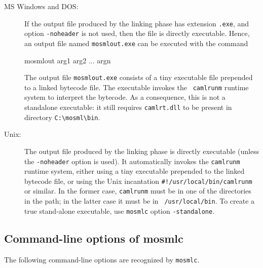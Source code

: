 \documentclass[fleqn,a4paper]{article}
\begin{document}
\begin{description}
\item[MS Windows and DOS:] If the output file produced by the linking
  phase has extension {\tt .exe}, and option {\tt -noheader} is not
  used, then the file is directly executable.  Hence, an output file
  named {\tt mosmlout.exe} can be executed with the command

\begin{program}
mosmlout arg1 arg2 ... argn    
\end{program}

The output file {\tt mosmlout.exe} consists of a tiny executable file
prepended to a linked bytecode file.  The executable invokes the {\tt
  camlrunm} runtime system to interpret the bytecode.  As a
consequence, this is not a standalone executable: it still requires
{\tt camlrt.dll} to be present in directory \verb+C:\mosml\bin+.

\item[Unix:] The output file produced by the linking phase is directly
  executable (unless the {\tt -noheader} option is used).  It
  automatically invokes the {\tt camlrunm} runtime system, either
  using a tiny executable prepended to the linked bytecode file, or
  using the Unix incantation \verb|#!/usr/local/bin/camlrunm| or
  similar.  In the former case, {\tt camlrunm} must be in one of the
  directories in the path; in the latter case it must be in {\tt
    /usr/local/bin}.  To create a true stand-alone executable, use
  \texttt{mosmlc} option \texttt{-standalone}.
\end{description}


\subsection{Command-line options of mosmlc}
\label{sec-mosmlc-options}

The following command-line options are recognized by {\tt mosmlc}.
\end{document}
